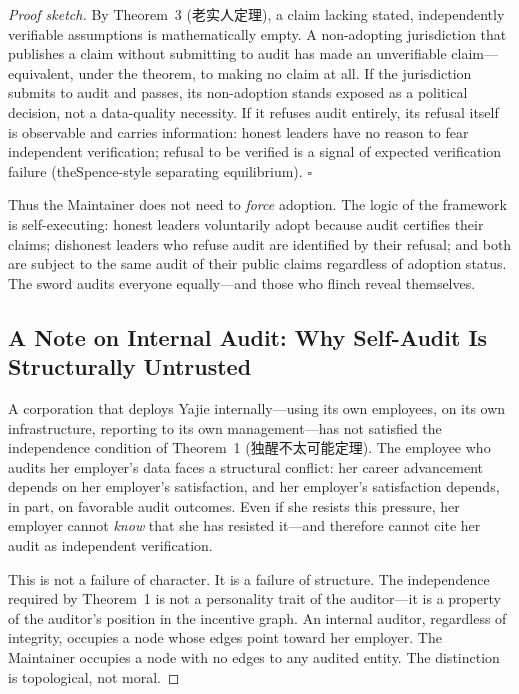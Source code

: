 \documentclass[12pt,a4paper]{ctexart}
\theoremstyle{definition}
\theoremstyle{remark}
\begin{document}
\begin{proof}[Proof sketch]
By Theorem~3 (老实人定理), a claim lacking stated, independently verifiable assumptions is mathematically empty. A non-adopting jurisdiction that publishes a claim without submitting to audit has made an unverifiable claim—equivalent, under the theorem, to making no claim at all. If the jurisdiction submits to audit and passes, its non-adoption stands exposed as a political decision, not a data-quality necessity. If it refuses audit entirely, its refusal itself is observable and carries information: honest leaders have no reason to fear independent verification; refusal to be verified is a signal of expected verification failure (theSpence-style separating equilibrium). $\square$

Thus the Maintainer does not need to \textit{force} adoption. The logic of the framework is self-executing: honest leaders voluntarily adopt because audit certifies their claims; dishonest leaders who refuse audit are identified by their refusal; and both are subject to the same audit of their public claims regardless of adoption status. The sword audits everyone equally—and those who flinch reveal themselves.

\subsection{A Note on Internal Audit: Why Self-Audit Is Structurally Untrusted}

A corporation that deploys Yajie internally—using its own employees, on its own infrastructure, reporting to its own management—has not satisfied the independence condition of Theorem~1 (独醒不太可能定理). The employee who audits her employer's data faces a structural conflict: her career advancement depends on her employer's satisfaction, and her employer's satisfaction depends, in part, on favorable audit outcomes. Even if she resists this pressure, her employer cannot \textit{know} that she has resisted it—and therefore cannot cite her audit as independent verification.

This is not a failure of character. It is a failure of structure. The independence required by Theorem~1 is not a personality trait of the auditor—it is a property of the auditor's position in the incentive graph. An internal auditor, regardless of integrity, occupies a node whose edges point toward her employer. The Maintainer occupies a node with no edges to any audited entity. The distinction is topological, not moral.


\end{proof}
\end{document}
